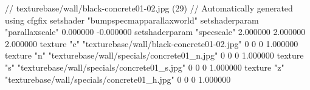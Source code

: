 // texturebase/wall/black-concrete01-02.jpg (29)
// Automatically generated using cfgfix
setshader "bumpspecmapparallaxworld"
setshaderparam "parallaxscale" 0.000000 -0.000000
setshaderparam "specscale" 2.000000 2.000000 2.000000
texture "c" "texturebase/wall/black-concrete01-02.jpg" 0 0 0 1.000000
texture "n" "texturebase/wall/specials/concrete01_n.jpg" 0 0 0 1.000000
texture "s" "texturebase/wall/specials/concrete01_s.jpg" 0 0 0 1.000000
texture "z" "texturebase/wall/specials/concrete01_h.jpg" 0 0 0 1.000000
